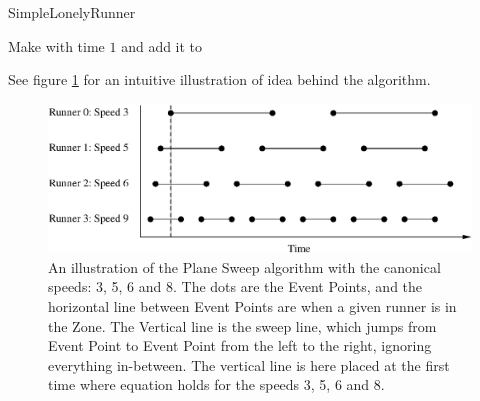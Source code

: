 \begin{algorithm}[H]
  \caption{SimpleLonelyRunner\label{simpleLonelyRunner}}
  \highlights
  
  Make \finish with time $1$ and add it to \li

  
\end{algorithm}

See figure \ref{algoIlluImg} for an intuitive illustration of idea behind the algorithm. 

\begin{figure}[H]
  \centering
  \includegraphics[width=\textwidth]{./images/algoIlluEPS}
  \caption{\label{algoIlluImg}An illustration of the Plane Sweep algorithm with the canonical speeds: 3, 5, 6 and 8. The dots are the Event Points, and the horizontal line between Event Points are when a given runner is in the Zone. The Vertical line is the sweep line, which jumps from Event Point to Event Point from the left to the right, ignoring everything in-between. The vertical line is here placed at the first time where equation  holds for the speeds 3, 5, 6 and 8.}
\end{figure}

